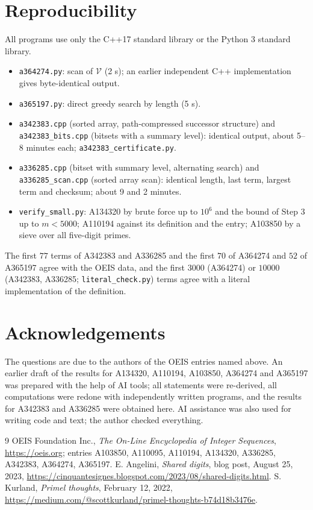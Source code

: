 \documentclass[11pt,a4paper]{article}
\theoremstyle{remark}
\begin{document}
\section{Reproducibility}\label{sec:repro}

All programs use only the C++17 standard library or the Python 3 standard library.
\begin{itemize}\raggedright
\item \texttt{a364274.py}: scan of $\mathcal V$ (2 s); an earlier independent C++ implementation gives byte-identical output.
\item \texttt{a365197.py}: direct greedy search by length (5 s).
\item \texttt{a342383.cpp} (sorted array, path-compressed successor structure) and \texttt{a342383\_bits.cpp} (bitsets with a summary level): identical output, about 5--8 minutes each; \texttt{a342383\_certificate.py}.
\item \texttt{a336285.cpp} (bitset with summary level, alternating search) and \texttt{a336285\_scan.cpp} (sorted array scan): identical length, last term, largest term and checksum; about 9 and 2 minutes.
\item \texttt{verify\_small.py}: A134320 by brute force up to $10^6$ and the bound of Step 3 up to $m<5000$; A110194 against its definition and the entry; A103850 by a sieve over all five-digit primes.
\end{itemize}
The first $77$ terms of A342383 and A336285 and the first $70$ of A364274 and $52$ of A365197 agree with the OEIS data, and the first $3000$ (A364274) or $10000$ (A342383, A336285; \texttt{literal\_check.py}) terms agree with a literal implementation of the definition.

\section*{Acknowledgements}
The questions are due to the authors of the OEIS entries named above. An earlier draft of the results for A134320, A110194, A103850, A364274 and A365197 was prepared with the help of AI tools; all statements were re-derived, all computations were redone with independently written programs, and the results for A342383 and A336285 were obtained here. AI assistance was also used for writing code and text; the author checked everything.

\begin{thebibliography}{9}
 OEIS Foundation Inc., \emph{The On-Line Encyclopedia of Integer Sequences}, \url{https://oeis.org}; entries A103850, A110095, A110194, A134320, A336285, A342383, A364274, A365197.
 E. Angelini, \emph{Shared digits}, blog post, August 25, 2023, \url{https://cinquantesignes.blogspot.com/2023/08/shared-digits.html}.
 S. Kurland, \emph{Primel thoughts}, February 12, 2022, \url{https://medium.com/@scottkurland/primel-thoughts-b74d18b3476e}.
\end{thebibliography}
\end{document}
